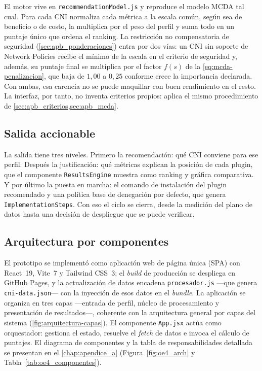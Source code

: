 El motor vive en \texttt{recommendationModel.js} y reproduce el modelo MCDA tal cual. Para cada CNI normaliza cada métrica a la escala común, según sea de beneficio o de costo, la multiplica por el peso del perfil y suma todo en un puntaje único que ordena el ranking. La restricción no compensatoria de seguridad (\cref{sec:apb_ponderaciones}) entra por dos vías: un CNI sin soporte de Network Policies recibe el mínimo de la escala en el criterio de seguridad y, además, su puntaje final se multiplica por el factor $f(s)$ de la \cref{eq:mcda-penalizacion}, que baja de $1{,}00$ a $0{,}25$ conforme crece la importancia declarada. Con ambas, esa carencia no se puede maquillar con buen rendimiento en el resto. La interfaz, por tanto, no inventa criterios propios: aplica el mismo procedimiento de \cref{sec:apb_criterios,sec:apb_mcda}.

\subsection{Salida accionable}

La salida tiene tres niveles. Primero la recomendación: qué CNI conviene para ese perfil. Después la justificación: qué métricas explican la posición de cada plugin, que el componente \texttt{ResultsEngine} muestra como ranking y gráfica comparativa. Y por último la puesta en marcha: el comando de instalación del plugin recomendado y una política base de denegación por defecto, que genera \texttt{ImplementationSteps}. Con eso el ciclo se cierra, desde la medición del plano de datos hasta una decisión de despliegue que se puede verificar.

\subsection{Arquitectura por componentes}

El prototipo se implementó como aplicación web de página única (SPA) con React~19, Vite~7 y Tailwind CSS~3; el \emph{build} de producción se despliega en GitHub Pages, y la actualización de datos encadena \texttt{procesador.js} ---que genera \texttt{cni-data.json}--- con la inyección de esos datos en el \emph{bundle}. La aplicación se organiza en tres capas ---entrada de perfil, núcleo de procesamiento y presentación de resultados---, coherente con la arquitectura general por capas del sistema (\cref{fig:arquitectura-capas}). El componente \texttt{App.jsx} actúa como orquestador: gestiona el estado, resuelve el \emph{fetch} de datos e invoca el cálculo de puntajes. El diagrama de componentes y la tabla de responsabilidades detallada se presentan en el \cref{chap:apendice_a} (Figura~\ref{fig:oe4_arch} y Tabla~\ref{tab:oe4_componentes}).

